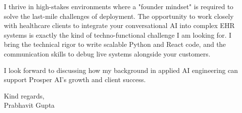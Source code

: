 \documentclass[11pt,a4paper]{article}
\begin{document}
I thrive in high-stakes environments where a "founder mindset" is required to solve the last-mile challenges of deployment. The opportunity to work closely with healthcare clients to integrate your conversational AI into complex EHR systems is exactly the kind of techno-functional challenge I am looking for. I bring the technical rigor to write scalable Python and React code, and the communication skills to debug live systems alongside your customers.


I look forward to discussing how my background in applied AI engineering can support Prosper AI's growth and client success.


\begin{flushright}
Kind regards, \\[3ex]


Prabhavit Gupta

\end{flushright}
\end{document}
